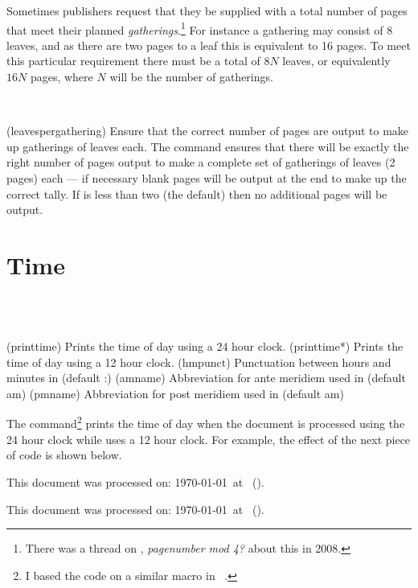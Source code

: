     Sometimes publishers request that they be supplied with a total number of
pages that meet their planned \emph{gatherings}.\footnote{There
was a thread on \ctt, \textit{pagenumber mod 4?} about this in 2008.}
 For instance
a gathering may consist of 8 leaves, and as there are two pages to a leaf this
is equivalent to 16 pages. To meet this particular requirement there must be 
a total of $8N$ leaves, or equivalently $16N$ pages, where $N$ will be 
the number of gatherings.

\begin{syntax}
\cmd{\leavespergathering} \\
\end{syntax}
\glossary(leavespergathering)%
  {}%
  {Ensure that the correct number of pages are output to make up gatherings 
   of  leaves each.}
The command \cmd{\leavespergathering} ensures that there will be exactly the
right number of pages output to make a complete set of gatherings of 
leaves (2 pages) each --- if necessary  blank pages will be output 
at the end to make up the correct tally. If  is less than two (the default)
then no additional pages will be output.


\section{Time}

\begin{syntax}
\cmd{\printtime} \cmd{\printtime*} \\
\cmd{\hmpunct} \cmd{\amname} \cmd{\pmname} \\
\end{syntax}
\glossary(printtime)%
  {}%
  {Prints the time of day using a 24 hour clock.}
\glossary(printtime*)%
  {}%
  {Prints the time of day using a 12 hour clock.}
\glossary(hmpunct)%
  {}%
  {Punctuation between hours and minutes in  (default :)}
\glossary(amname)%
  {}%
  {Abbreviation for ante meridiem used in  (default am)}
\glossary(pmname)%
  {}%
  {Abbreviation for post meridiem used in  (default am)}

The \cmd{\printtime} command\footnote{I based the code on a similar macro
in ~\cite{IMPATIENT}.} 
prints the time of day when the document is 
processed using the 24 hour clock while \cmd{\printtime*} uses a 12
hour clock. For example, the effect of the 
next piece of code is shown below.
\begin{lcode}
This document was processed on: \today\ at \printtime\ (\printtime*).
\end{lcode}
This document was processed on: \today\ at \printtime\ (\printtime*).

